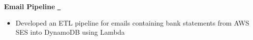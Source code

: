 \textbf{Email Pipeline} \href{https://github.com/ininicho/personal-pipeline}{\github\ } \par
\begin{itemize}
  \item Developed an ETL pipeline for emails containing bank statements from AWS SES into DynamoDB using Lambda
\end{itemize}
\vspace{0.1cm} \par
